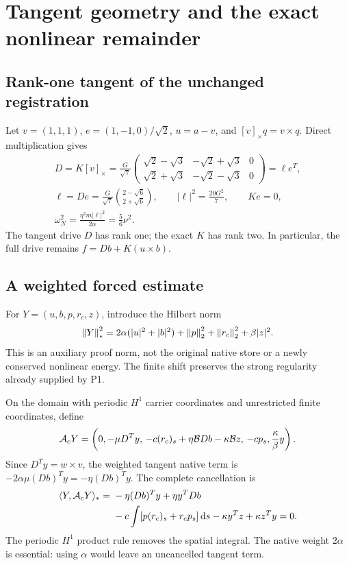 \section{Tangent geometry and the exact nonlinear remainder}\label{sec:tangent}
\subsection{Rank-one tangent of the unchanged registration}
Let $v=(1,1,1)$, $e=(1,-1,0)/\sqrt2$, $u=a-v$, and $[v]_\times q=v\times q$. Direct multiplication gives
\begin{equation}\label{eq:tangent}%
\begin{gathered}
 D=K[v]_\times
 =\frac G{\sqrt7}
 \begin{pmatrix}
 \sqrt2-\sqrt3&-\sqrt2+\sqrt3&0\\
 \sqrt2+\sqrt3&-\sqrt2-\sqrt3&0
 \end{pmatrix}
 =\ell e^T,\\
 \ell=De=\frac G{\sqrt7}
 \binom{2-\sqrt6}{2+\sqrt6},\qquad
 |\ell|^2=\frac{20G^2}{7},\qquad Ke=0,\\
 \omega_N^2=\frac{\eta^2m|\ell|^2}{2\alpha}=\frac56\nu^2 .
\end{gathered}
\end{equation}
The tangent drive $D$ has rank one; the exact $K$ has rank two. In particular, the full drive remains $f=Db+K(u\times b)$.

\subsection{A weighted forced estimate}\label{sec:forced}
For $Y=(u,b,p,r_c,z)$, introduce the Hilbert norm
\begin{equation}\label{eq:auxnorm}%
 \norm Y_*^2=2\alpha(|u|^2+|b|^2)
       +\norm p_2^2+\norm{r_c}_2^2+\beta|z|^2 .
\end{equation}
This is an auxiliary proof norm, not the original native store or a newly conserved nonlinear energy. The finite shift preserves the strong regularity already supplied by P1.

On the domain with periodic $H^1$ carrier coordinates and unrestricted finite coordinates, define
\begin{equation}\label{eq:operator}%
 \Ac Y=\left(
 0,-\mu D^Ty,\,
 -c(r_c)_s+\eta\B Db-\kappa\B z,\,
 -cp_s,\frac{\kappa}{\beta}y
 \right).
\end{equation}
Since $D^Ty=w\times v$, the weighted tangent native term is
$-2\alpha\mu(Db)^Ty=-\eta(Db)^Ty$. The complete cancellation is
\begin{equation}\label{eq:skew}%
\begin{aligned}
 \langle Y,\Ac Y\rangle_*
 ={}&-\eta(Db)^Ty+\eta y^TDb\\
 &-c\int[p(r_c)_s+r_cp_s]\dd s
 -\kappa y^Tz+\kappa z^Ty=0 .
\end{aligned}
\end{equation}
The periodic $H^1$ product rule removes the spatial integral. The native weight $2\alpha$ is essential: using $\alpha$ would leave an uncancelled tangent term.

